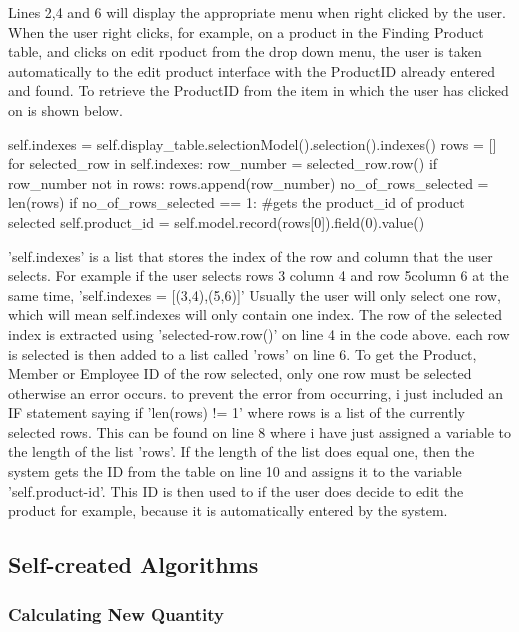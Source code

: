 \begin{python}
Lines 2,4 and 6 will display the appropriate menu when right clicked by the user. When the user right clicks, for example, on a product in the Finding Product table, and clicks on edit rpoduct from the drop down menu, the user is taken automatically to the edit product interface with the ProductID already entered and found. To retrieve the ProductID from the item in which the user has clicked on is shown below.

\begin{python}
self.indexes = self.display_table.selectionModel().selection().indexes()
rows = []
for selected_row in self.indexes:
	row_number = selected_row.row()
	if row_number not in rows:
		rows.append(row_number)      
no_of_rows_selected = len(rows)
if no_of_rows_selected == 1:
            #gets the product_id of product selected
            self.product_id = self.model.record(rows[0]).field(0).value()
\end{python}

'self.indexes' is a list that stores the index of the row and column that the user selects. For example if the user selects rows 3 column 4 and row 5column 6 at the same time, 'self.indexes = [(3,4),(5,6)]' Usually the user will only select one row, which will mean self.indexes will only contain one index. The row of the selected index is extracted using 'selected-row.row()' on line 4 in the code above. each row is selected is then added to a list called 'rows' on line 6. To get the Product, Member or Employee ID of the row selected, only one row must be selected otherwise an error occurs. to prevent the error from occurring, i just included an IF statement saying if 'len(rows) != 1' where rows is a list of the currently selected rows. This can be found on line 8 where i have just assigned a variable to the length of the list 'rows'. If the length of the list does equal one, then the system gets the ID from the table on line 10 and assigns it to the variable 'self.product-id'. This ID is then used to if the user does decide to edit the product for example, because it is automatically entered by the system.


\pagebreak

\subsection{Self-created Algorithms}

\subsubsection{Calculating New Quantity}


\end{python}
